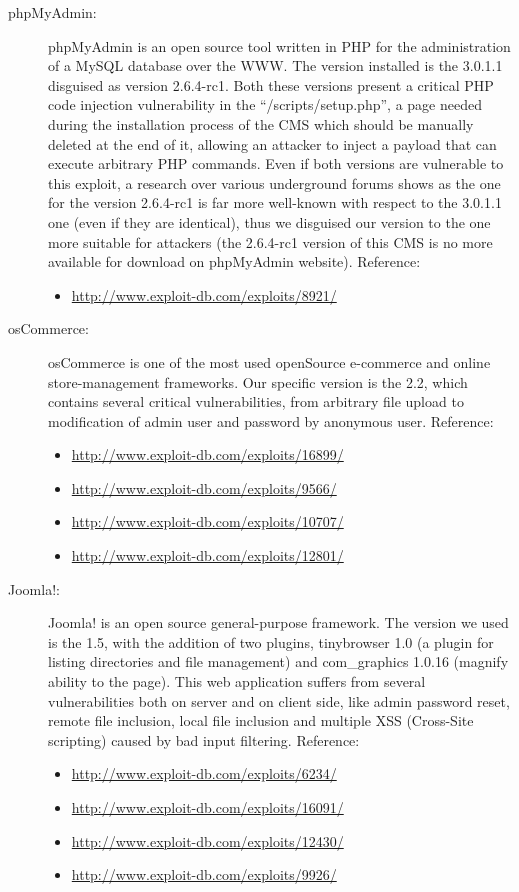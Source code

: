 \begin{description}
\item[phpMyAdmin: ] phpMyAdmin \cite{phpMyAdmin} is an open source tool written in PHP for the administration of a MySQL database over the WWW. The version installed is the 3.0.1.1 disguised as version 2.6.4-rc1. Both these versions present a critical PHP code injection vulnerability in the ``/scripts/setup.php'', a page needed during the installation process of the CMS which should be manually deleted at the end of it, allowing an attacker to inject a payload that can execute arbitrary PHP commands. Even if both versions are vulnerable to this exploit, a research over various underground forums shows as the one for the version 2.6.4-rc1 is far more well-known with respect to the 3.0.1.1 one (even if they are identical), thus we disguised our version to the one more suitable for attackers (the 2.6.4-rc1 version of this CMS is no more available for download on phpMyAdmin website).
Reference:
\begin{itemize}
\item
\url{http://www.exploit-db.com/exploits/8921/}
\end{itemize}

\item[osCommerce: ] osCommerce \cite{osCommerce} is one of the most used openSource e-commerce and online store-management frameworks. Our specific version is the 2.2, which contains several critical vulnerabilities, from arbitrary file upload to modification of admin user and password by anonymous user.
Reference:
\begin{itemize}
\item
\url{http://www.exploit-db.com/exploits/16899/}
\item
\url{http://www.exploit-db.com/exploits/9566/}
\item
\url{http://www.exploit-db.com/exploits/10707/}
\item
\url{http://www.exploit-db.com/exploits/12801/}
\end{itemize}

\item[Joomla!: ] Joomla! \cite{joomla} is an open source general-purpose framework. The version we used is the 1.5, with the addition of two plugins, tinybrowser 1.0 (a plugin for listing directories and file management) and com\_graphics 1.0.16 (magnify ability to the page). This web application suffers from several vulnerabilities both on server and on client side, like admin password reset, remote file inclusion, local file inclusion and multiple XSS (Cross-Site scripting) caused by bad input filtering.
Reference:
\begin{itemize}
\item
\url{http://www.exploit-db.com/exploits/6234/}
\item
\url{http://www.exploit-db.com/exploits/16091/}
\item
\url{http://www.exploit-db.com/exploits/12430/}
\item
\url{http://www.exploit-db.com/exploits/9926/}
\end{itemize}


\end{description}

